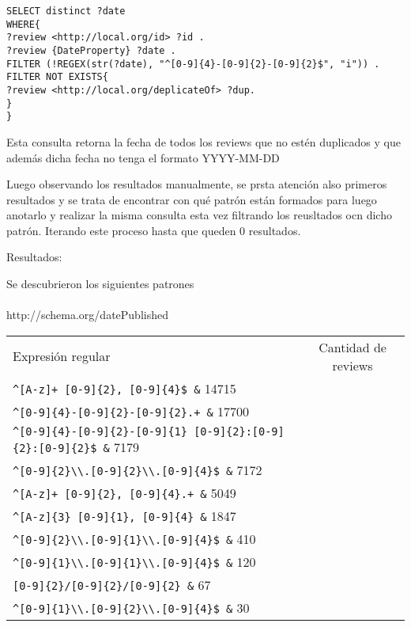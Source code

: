 \begin{lstlisting}[frame=single]  
SELECT distinct ?date 
WHERE{
?review <http://local.org/id> ?id .
?review {DateProperty} ?date .
FILTER (!REGEX(str(?date), "^[0-9]{4}-[0-9]{2}-[0-9]{2}$", "i")) .
FILTER NOT EXISTS{
?review <http://local.org/deplicateOf> ?dup.
}
}
\end{lstlisting}



Esta consulta retorna la fecha de todos los reviews que no estén duplicados y que además dicha fecha no tenga el formato YYYY-MM-DD

Luego observando los resultados manualmente, se prsta atención also primeros resultados y se trata de encontrar con qué patrón están formados 
para luego anotarlo y realizar la misma consulta esta vez filtrando los reusltados ocn dicho patrón. Iterando este proceso hasta que 
queden 0 resultados.

Resultados:

Se descubrieron los siguientes patrones
\\
\\
http://schema.org/datePublished
\begin{tabular}{| l | c |}
Expresión regular & Cantidad de reviews\\
\verb|^[A-z]+ [0-9]{2}, [0-9]{4}$ &| 14715 \\
\verb|^[0-9]{4}-[0-9]{2}-[0-9]{2}.+ &| 17700 \\
\verb|^[0-9]{4}-[0-9]{2}-[0-9]{1} [0-9]{2}:[0-9]{2}:[0-9]{2}$ &| 7179 \\
\verb|^[0-9]{2}\\.[0-9]{2}\\.[0-9]{4}$ &| 7172\\
\verb|^[A-z]+ [0-9]{2}, [0-9]{4}.+ &| 5049\\
\verb|^[A-z]{3} [0-9]{1}, [0-9]{4} &| 1847\\
\verb|^[0-9]{2}\\.[0-9]{1}\\.[0-9]{4}$ &| 410\\
\verb|^[0-9]{1}\\.[0-9]{1}\\.[0-9]{4}$ &| 120\\
\verb|[0-9]{2}/[0-9]{2}/[0-9]{2} &| 67\\
\verb|^[0-9]{1}\\.[0-9]{2}\\.[0-9]{4}$ &| 30
\end{tabular}

